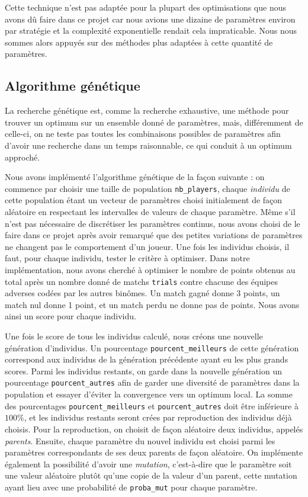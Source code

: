 \documentclass[a4paper,12pt]{article}
\begin{document}
Cette technique n'est pas adaptée pour la plupart des optimisations que nous avons dû faire dans ce projet car nous avions une dizaine de paramètres environ par stratégie et la complexité exponentielle rendait cela impraticable. Nous nous sommes alors appuyés sur des méthodes plus adaptées à cette quantité de paramètres.

\subsection{Algorithme génétique}

La recherche génétique est, comme la recherche exhaustive, une méthode pour trouver un optimum sur un ensemble donné de paramètres, mais, différemment de celle-ci, on ne teste pas toutes les combinaisons possibles de paramètres afin d'avoir une recherche dans un temps raisonnable, ce qui conduit à un optimum approché.

Nous avons implémenté l'algorithme génétique de la façon suivante : on commence par choisir une taille de population \texttt{nb\_players}, chaque \emph{individu} de cette population étant un vecteur de paramètres choisi initialement de façon aléatoire en respectant les intervalles de valeurs de chaque paramètre. Même s'il n'est pas nécessaire de discrétiser les paramètres continus, nous avons choisi de le faire dans ce projet après avoir remarqué que des petites variations de paramètres ne changent pas le comportement d'un joueur. Une fois les individus choisis, il faut, pour chaque individu, tester le critère à optimiser. Dans notre implémentation, nous avons cherché à optimiser le nombre de points obtenus au total après un nombre donné de matchs \texttt{trials} contre chacune des équipes adverses codées par les autres binômes. Un match gagné donne 3 points, un match nul donne 1 point, et un match perdu ne donne pas de points. Nous avons ainsi un score pour chaque individu.

Une fois le score de tous les individus calculé, nous créons une nouvelle génération d'individus. Un pourcentage \texttt{pourcent\_meilleurs} de cette génération correspond aux individus de la génération précédente ayant eu les plus grands scores. Parmi les individus restants, on garde dans la nouvelle génération un pourcentage \texttt{pourcent\_autres} afin de garder une diversité de paramètres dans la population et essayer d'éviter la convergence vers un optimum local. La somme des pourcentages \texttt{pourcent\_meilleurs} et \texttt{pourcent\_autres} doit être inférieure à $100 \%$, et les individus restants seront crées par reproduction des individus déjà choisis. Pour la reproduction, on choisit de façon aléatoire deux individus, appelés \emph{parents}. Ensuite, chaque paramètre du nouvel individu est choisi parmi les paramètres correspondants de ses deux parents de façon aléatoire. On implémente également la possibilité d'avoir une \emph{mutation}, c'est-à-dire que le paramètre soit une valeur aléatoire plutôt qu'une copie de la valeur d'un parent, cette mutation ayant lieu avec une probabilité de \texttt{proba\_mut} pour chaque paramètre.
\end{document}
